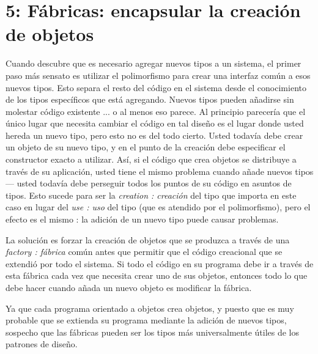 \section*{\texorpdfstring{5: Fábricas: \newline  encapsular \newline la creación de objetos}{5: Fábricas: encapsular la creación de objetos}}
\label{sec:felcdo}


Cuando descubre que es necesario agregar nuevos tipos a un sistema, el primer paso más sensato es utilizar el polimorfismo para crear una interfaz común a esos nuevos tipos. Esto separa el resto del código en el sistema desde el conocimiento de los tipos específicos que está agregando. Nuevos tipos pueden añadirse sin molestar código existente ... o al menos eso parece. Al principio parecería que el único lugar que necesita cambiar el código en tal diseño es el lugar donde usted hereda un nuevo tipo, pero esto no es del todo cierto. Usted todavía debe crear un objeto de su nuevo tipo, y en el punto de la creación debe especificar el constructor exacto a utilizar. Así, si el código que crea objetos se distribuye a través de su aplicación, usted tiene el mismo problema cuando añade nuevos tipos — usted todavía debe perseguir todos los puntos de su código en asuntos de tipos. Esto sucede para ser la \textit{creation : creación} del tipo que importa en este caso en lugar del \textit{use : uso} del tipo (que es atendido por el polimorfismo), pero el efecto es el mismo : la adición de un nuevo tipo puede causar problemas. \newline

La solución es forzar la creación de objetos que se produzca a través de una \textit{factory : fábrica} común antes que permitir que el código creacional que se extendió por todo el sistema. Si todo el código en su programa debe ir a través de esta fábrica cada vez que necesita crear uno de sus objetos, entonces todo lo que debe hacer cuando añada un nuevo objeto es modificar la fábrica.   \newline

Ya que cada programa orientado a objetos crea objetos, y puesto que es muy probable que se extienda su programa mediante la adición de nuevos tipos, sospecho que las fábricas pueden ser los tipos más universalmente útiles de los patrones de diseño.  \newline

